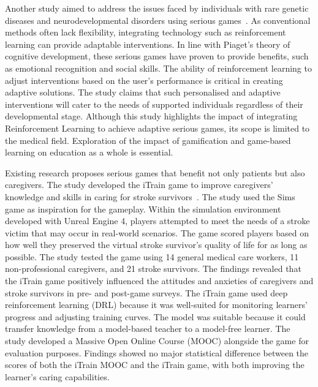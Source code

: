 \documentclass[12pt,a4paper]{report}
\begin{document}
\quad Another study aimed to address the issues faced by individuals with rare genetic diseases and neurodevelopmental disorders using serious games~\cite{12}. As conventional methods often lack flexibility, integrating technology such as reinforcement learning can provide adaptable interventions. In line with Piaget’s theory of cognitive development, these serious games have proven to provide benefits, such as emotional recognition and social skills. The ability of reinforcement learning to adjust interventions based on the user’s performance is critical in creating adaptive solutions. The study claims that such personalised and adaptive interventions will cater to the needs of supported individuals regardless of their developmental stage. Although this study highlights the impact of integrating Reinforcement Learning to achieve adaptive serious games, its scope is limited to the medical field. Exploration of the impact of gamification and game-based learning on education as a whole is essential.

\quad Existing research proposes serious games that benefit not only patients but also caregivers. The study developed the iTrain game to improve caregivers' knowledge and skills in caring for stroke survivors~\cite{13}. The study used the Sims game as inspiration for the gameplay. Within the simulation environment developed with Unreal Engine 4, players attempted to meet the needs of a stroke victim that may occur in real-world scenarios. The game scored players based on how well they preserved the virtual stroke survivor’s quality of life for as long as possible. The study tested the game using 14 general medical care workers, 11 non-professional caregivers, and 21 stroke survivors. The findings revealed that the iTrain game positively influenced the attitudes and anxieties of caregivers and stroke survivors in pre- and post-game surveys. The iTrain game used deep reinforcement learning (DRL) because it was well-suited for monitoring learners’ progress and adjusting training curves. The model was suitable because it could transfer knowledge from a model-based teacher to a model-free learner. The study developed a Massive Open Online Course (MOOC) alongside the game for evaluation purposes. Findings showed no major statistical difference between the scores of both the iTrain MOOC and the iTrain game, with both improving the learner’s caring capabilities. 
\end{document}
